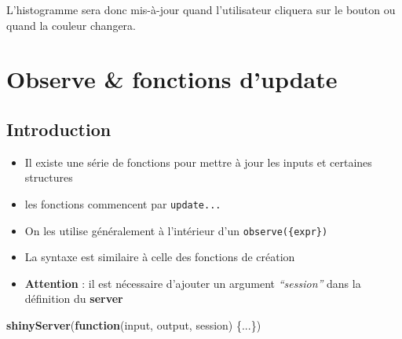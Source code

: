 \documentclass[
]{article}
\newenvironment{Shaded}{\begin{snugshade}}{\end{snugshade}}
\newcommand{\AttributeTok}[1]{\textcolor[rgb]{0.13,0.29,0.53}{#1}}
\newcommand{\ControlFlowTok}[1]{\textcolor[rgb]{0.13,0.29,0.53}{\textbf{#1}}}
\newcommand{\DecValTok}[1]{\textcolor[rgb]{0.00,0.00,0.81}{#1}}
\newcommand{\FunctionTok}[1]{\textcolor[rgb]{0.13,0.29,0.53}{\textbf{#1}}}
\newcommand{\NormalTok}[1]{#1}
\newcommand{\OtherTok}[1]{\textcolor[rgb]{0.56,0.35,0.01}{#1}}
\newcommand{\SpecialCharTok}[1]{\textcolor[rgb]{0.81,0.36,0.00}{\textbf{#1}}}
\newcommand{\StringTok}[1]{\textcolor[rgb]{0.31,0.60,0.02}{#1}}
\begin{document}
\begin{Shaded}
\end{Shaded}

L'histogramme sera donc mis-à-jour quand l'utilisateur cliquera sur le
bouton ou quand la couleur changera.

\hypertarget{observe-fonctions-dupdate}{%
\section{Observe \& fonctions
d'update}\label{observe-fonctions-dupdate}}

\hypertarget{introduction-1}{%
\subsection{Introduction}\label{introduction-1}}

\begin{itemize}
\item
  Il existe une série de fonctions pour mettre à jour les inputs et
  certaines structures
\item
  les fonctions commencent par \texttt{update...}
\item
  On les utilise généralement à l'intérieur d'un
  \texttt{observe(\{expr\})}
\item
  La syntaxe est similaire à celle des fonctions de création
\item
  \textbf{Attention} : il est nécessaire d'ajouter un argument
  \emph{``session''} dans la définition du \textbf{server}
\end{itemize}

\begin{Shaded}
\begin{Highlighting}[]
\FunctionTok{shinyServer}\NormalTok{(}\ControlFlowTok{function}\NormalTok{(input, output, session) \{...\})}
\end{Highlighting}
\end{Shaded}
\end{document}
